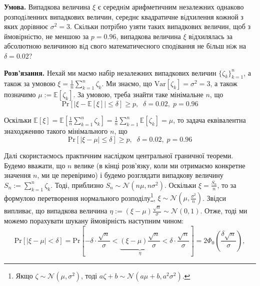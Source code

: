 \documentclass[oneside,solution]{karazin-prob-theory-assign}
\begin{document}

\hspace{20px}\textbf{Умова.} Випадкова величина $\xi$ є середнiм арифметичним незалежних однаково розподiленних випадкових величин, середнє квадратичне вiдхилення кожной з яких дорiвнює $\sigma^2 = 3$. Скiльки потрiбно узяти
таких випадкових величин, щоб з ймовiрнiстю, не меншою за $p=0.96$, випадкова величина $\xi$ вiдхилялась
за абсолютною величиною вiд свого математичесного сподiвання не бiльш нiж на $\delta = 0.02$?

\textbf{Розв'язання.} Нехай ми маємо набір незалежних випадкових величин $\{\zeta_k\}_{k=1}^n$, а також за умовою $\xi = \frac{1}{n}\sum_{k=1}^n \zeta_k$. Ми знаємо, що $\text{Var}[\zeta_k]=\sigma^2=3$, а також позначимо $\mu := \mathbb{E}[\zeta_k]$. За умовою, треба знайти таке мінімальне $n$, що
\begin{equation}
    \text{Pr}[|\xi - \mathbb{E}[\xi]| \leq \delta] \geq p, \; \; \delta=0.02, \; p = 0.96
\end{equation}

Оскільки $\mathbb{E}[\xi] = \mathbb{E}[\frac{1}{n}\sum_{k=1}^n \zeta_k] = \frac{1}{n}\sum_{k=1}^n\mathbb{E}[\zeta_k] = \mu$, то задача еквівалентна знаходженню такого мінімального $n$, що
\begin{equation}
    \text{Pr}[|\xi - \mu| \leq \delta] \geq p, \; \; \delta=0.02, \; p = 0.96
\end{equation}

Далі скористаємось практичним наслідком центральної граничної теореми. Будемо вважати, що $n$ велике (в кінці розв'язку, коли ми отримаємо конкретне значення $n$, ми це перевіримо) і будемо розглядати випадкову величину $S_n := \sum_{k=1}^n \zeta_k$. Тоді, приблизно $S_n \sim \mathcal{N}(n\mu, n\sigma^2)$. Оскільки $\xi = \frac{S_n}{n}$, то за формулою перетворення нормального розподілу\footnote{Якщо $\zeta \sim \mathcal{N}(\mu,\sigma^2)$, тоді $a\zeta+b \sim \mathcal{N}(a\mu + b, a^2\sigma^2)$.}, $\xi \sim \mathcal{N}(\mu,\frac{\sigma^2}{n})$. Звідси випливає, що випадкова величина $\eta := (\xi-\mu)\frac{\sqrt{n}}{\sigma} \sim \mathcal{N}(0,1)$. Отже, тоді ми можемо порахувати шукану ймовірність наступним чином:
\begin{equation}
    \text{Pr}[|\xi-\mu|<\delta] = \text{Pr}\left[-\delta\cdot\frac{\sqrt{n}}{\sigma} < \underbrace{(\xi-\mu)\frac{\sqrt{n}}{\sigma}}_{\eta} < \delta\cdot\frac{\sqrt{n}}{\sigma}\right] = 2\Phi_0\left(\frac{\delta\sqrt{n}}{\sigma}\right),
\end{equation}
\end{document}
